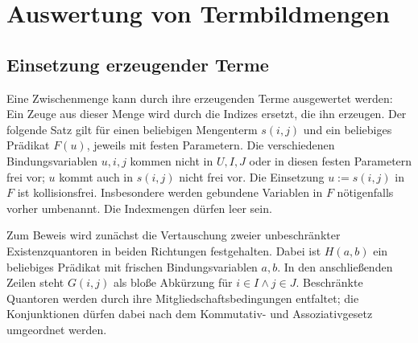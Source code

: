 \chapter{Auswertung von Termbildmengen}
\section{Einsetzung erzeugender Terme}

Eine Zwischenmenge kann durch ihre erzeugenden Terme ausgewertet werden:
Ein Zeuge aus dieser Menge wird durch die Indizes ersetzt, die ihn erzeugen.
Der folgende Satz gilt für einen beliebigen Mengenterm \(s(i,j)\) und
ein beliebiges Prädikat \(F(u)\), jeweils mit festen Parametern.
Die verschiedenen Bindungsvariablen \(u,i,j\) kommen nicht in
\(U,I,J\) oder in diesen festen Parametern frei vor; \(u\) kommt auch
in \(s(i,j)\) nicht frei vor. Die Einsetzung \(u:=s(i,j)\) in \(F\)
ist kollisionsfrei. Insbesondere werden gebundene Variablen in \(F\)
nötigenfalls vorher umbenannt. Die Indexmengen dürfen leer sein.


Zum Beweis wird zunächst die Vertauschung zweier unbeschränkter
Existenzquantoren in beiden Richtungen festgehalten. Dabei ist
\(H(a,b)\) ein beliebiges Prädikat mit frischen Bindungsvariablen
\(a,b\). In den anschließenden Zeilen steht
\(G(i,j)\) als bloße Abkürzung für \(i\in I\land j\in J\).
Beschränkte Quantoren werden durch ihre Mitgliedschaftsbedingungen
entfaltet; die Konjunktionen dürfen dabei nach dem Kommutativ- und
Assoziativgesetz umgeordnet werden.

